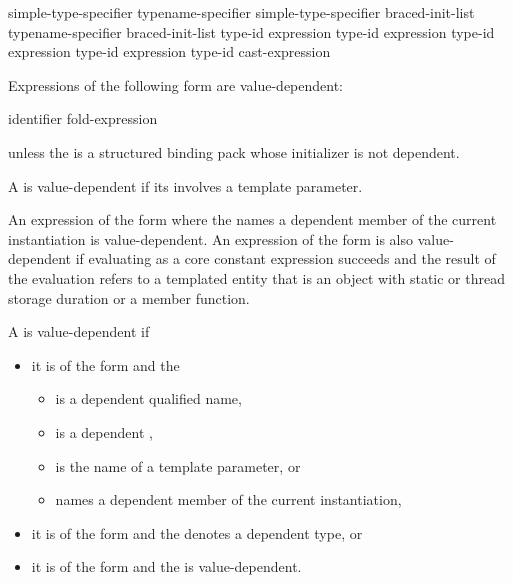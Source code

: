 \begin{ncsimplebnf}
simple-type-specifier \terminal{(}  \terminal{)}\br
typename-specifier \terminal{(}  \terminal{)}\br
simple-type-specifier braced-init-list\br
typename-specifier braced-init-list\br
{} \terminal{<} type-id \terminal{>} \terminal{(} expression \terminal{)}\br
{} \terminal{<} type-id \terminal{>} \terminal{(} expression \terminal{)}\br
{} \terminal{<} type-id \terminal{>} \terminal{(} expression \terminal{)}\br
{} \terminal{<} type-id \terminal{>} \terminal{(} expression \terminal{)}\br
\terminal{(} type-id \terminal{)} cast-expression
\end{ncsimplebnf}

\pnum
Expressions of the following form are value-dependent:

\begin{ncsimplebnf}
  \terminal{(} identifier \terminal{)}\br
fold-expression
\end{ncsimplebnf}
unless the  is a structured binding pack
whose initializer is not dependent.

\pnum
A 
is value-dependent if
its  involves a template parameter.

\pnum
An expression of the form \tcode{\&} where the
 names a dependent member of the current
instantiation is value-dependent.
An expression of the form \tcode{\&}
is also value-dependent if evaluating 
as a core constant expression succeeds and
the result of the evaluation refers to a templated entity
that is an object with static or thread storage duration or a member function.

\pnum
A  is value-dependent if
\begin{itemize}
\item
it is of the form  and
the 
\begin{itemize}
\item is a dependent qualified name,
\item is a dependent ,
\item is the name of a template parameter, or
\item names a dependent member of the current instantiation,
\end{itemize}
\item
it is of the form  and
the  denotes a dependent type, or
\item
it is of the form  and
the  is value-dependent.
\end{itemize}

